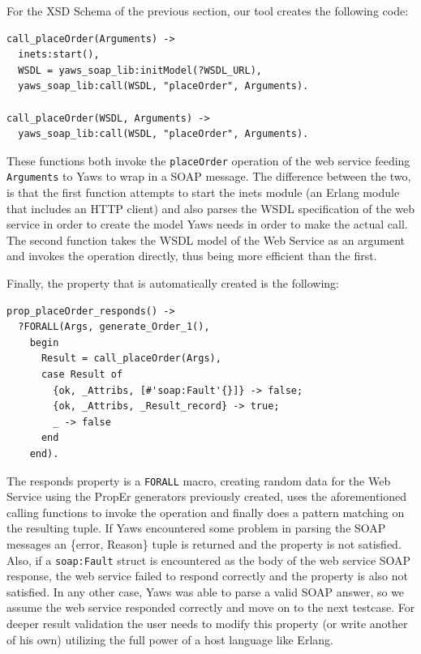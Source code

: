 \documentclass[submission,copyright,a4]{eptcs}
\begin{document}
For the XSD Schema of the previous section, our tool creates the following code:
\begin{lstlisting}
call_placeOrder(Arguments) ->
  inets:start(),
  WSDL = yaws_soap_lib:initModel(?WSDL_URL),
  yaws_soap_lib:call(WSDL, "placeOrder", Arguments).
    
call_placeOrder(WSDL, Arguments) ->
  yaws_soap_lib:call(WSDL, "placeOrder", Arguments).
\end{lstlisting}

These functions both invoke the \texttt{placeOrder} operation of the
web service feeding \texttt{Arguments} to Yaws to wrap in a SOAP
message. The difference between the two, is that the first function
attempts to start the inets module (an Erlang module that includes an
HTTP client) and also parses the WSDL specification of the web service
in order to create the model Yaws needs in order to make the actual
call. The second function takes the WSDL model of the Web Service as
an argument and invokes the operation directly, thus being more
efficient than the first.

Finally, the property that is automatically created is the following:

\begin{lstlisting}
prop_placeOrder_responds() ->
  ?FORALL(Args, generate_Order_1(),
    begin
      Result = call_placeOrder(Args),
      case Result of 
        {ok, _Attribs, [#'soap:Fault'{}]} -> false;
        {ok, _Attribs, _Result_record} -> true;
        _ -> false
      end
    end).
\end{lstlisting}

The responds property is a \texttt{FORALL} macro, creating random data for the Web Service using 
the PropEr generators previously created, uses the aforementioned calling functions to 
invoke the operation and finally does a pattern matching on the resulting tuple. If Yaws 
encountered some problem in parsing the SOAP messages an \{error, Reason\} tuple is returned
and the property is not satisfied. Also, if a \texttt{soap:Fault} struct is encountered as the 
body of the web service SOAP response, the web service failed to respond correctly and the 
property is also not satisfied. In any other case, Yaws was able to parse a valid SOAP answer, 
so we assume the web service responded correctly and move on to the next testcase. For deeper
result validation the user needs to modify this property (or write another of his own) utilizing
the full power of a host language like Erlang.
\end{document}
